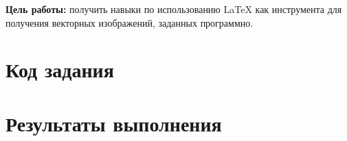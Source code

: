 \documentclass[a4paper, 14pt]{extarticle}
\begin{document}
    \graphicspath{{images/}{images2/}} %

    \author{М.А.Гейне}
    \bmstutitlelab

    \textbf{Цель работы:} 
    получить навыки по использованию LaTeX как инструмента для получения векторных изображений, заданных программно.

    \section{Код задания}

    
    \section{Результаты выполнения}
    
\end{document}
